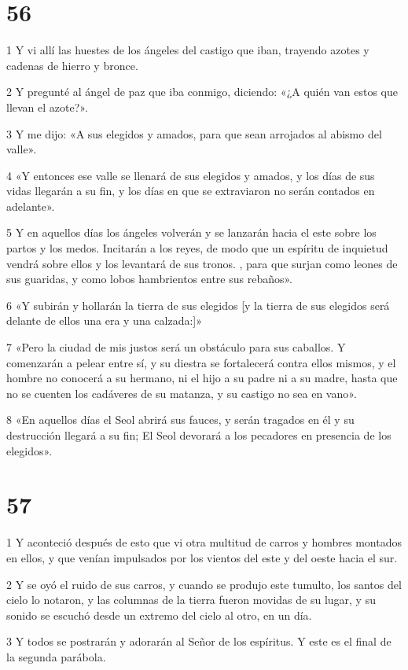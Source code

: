 \chapter{56}

\par 1 Y vi allí las huestes de los ángeles del castigo que iban, trayendo azotes y cadenas de hierro y bronce.
\par 2 Y pregunté al ángel de paz que iba conmigo, diciendo: «¿A quién van estos que llevan el azote?».
\par 3 Y me dijo: «A sus elegidos y amados, para que sean arrojados al abismo del valle».
\par 4 «Y entonces ese valle se llenará de sus elegidos y amados, y los días de sus vidas llegarán a su fin, y los días en que se extraviaron no serán contados en adelante».
\par 5 Y en aquellos días los ángeles volverán y se lanzarán hacia el este sobre los partos y los medos. Incitarán a los reyes, de modo que un espíritu de inquietud vendrá sobre ellos y los levantará de sus tronos. , para que surjan como leones de sus guaridas, y como lobos hambrientos entre sus rebaños».
\par 6 «Y subirán y hollarán la tierra de sus elegidos [y la tierra de sus elegidos será delante de ellos una era y una calzada:]»
\par 7 «Pero la ciudad de mis justos será un obstáculo para sus caballos. Y comenzarán a pelear entre sí, y su diestra se fortalecerá contra ellos mismos, y el hombre no conocerá a su hermano, ni el hijo a su padre ni a su madre, hasta que no se cuenten los cadáveres de su matanza, y su castigo no sea en vano».
\par 8 «En aquellos días el Seol abrirá sus fauces, y serán tragados en él y su destrucción llegará a su fin; El Seol devorará a los pecadores en presencia de los elegidos».

\chapter{57}

\par 1 Y aconteció después de esto que vi otra multitud de carros y hombres montados en ellos, y que venían impulsados ​​por los vientos del este y del oeste hacia el sur.
\par 2 Y se oyó el ruido de sus carros, y cuando se produjo este tumulto, los santos del cielo lo notaron, y las columnas de la tierra fueron movidas de su lugar, y su sonido se escuchó desde un extremo del cielo al otro, en un día.
\par 3 Y todos se postrarán y adorarán al Señor de los espíritus. Y este es el final de la segunda parábola.

